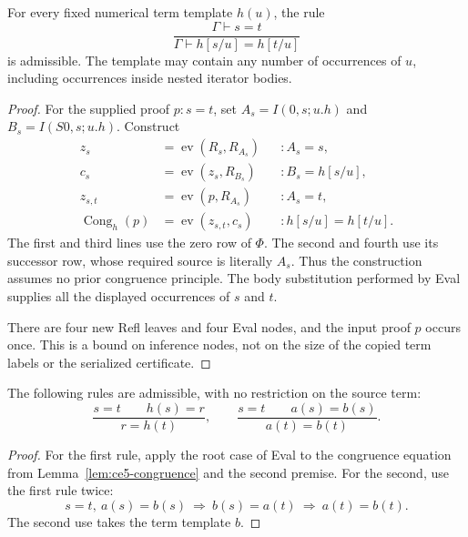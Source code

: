 \begin{lemma}
\label{lem:ce5-congruence}
For every fixed numerical term template $h(u)$, the rule
\[
 \frac{\Gamma\vdash s=t}
      {\Gamma\vdash h[s/u]=h[t/u]}
\]
is admissible. The template may contain any number of occurrences of
$u$, including occurrences inside nested iterator bodies.
\end{lemma}
\begin{proof}
For the supplied proof $p:s=t$, set
$A_s=I(0,s;u.h)$ and $B_s=I(S0,s;u.h)$. Construct
\[
\begin{aligned}
 z_s&=\operatorname{ev}(R_s,R_{A_s})
       &&: A_s=s,\\
 c_s&=\operatorname{ev}(z_s,R_{B_s})
       &&: B_s=h[s/u],\\
 z_{s,t}&=\operatorname{ev}(p,R_{A_s})
       &&: A_s=t,\\
 \operatorname{Cong}_h(p)&=\operatorname{ev}(z_{s,t},c_s)
       &&: h[s/u]=h[t/u].
\end{aligned}
\]
The first and third lines use the zero row of $\Phi$. The second and
fourth use its successor row, whose required source is literally
$A_s$. Thus the construction assumes no prior congruence principle.
The body substitution performed by Eval supplies all the displayed
occurrences of $s$ and $t$.

There are four new Refl leaves and four Eval nodes, and the input proof
$p$ occurs once. This is a bound on inference nodes, not on the size of
the copied term labels or the serialized certificate.
\end{proof}

\begin{corollary}
The following rules are admissible, with no restriction on the source
term:
\[
 \frac{s=t\qquad h(s)=r}{r=h(t)},\qquad
 \frac{s=t\qquad a(s)=b(s)}{a(t)=b(t)}.
\]
\end{corollary}
\begin{proof}
For the first rule, apply the root case of Eval to the congruence
equation from Lemma~\ref{lem:ce5-congruence} and the second premise.
For the second, use the first rule twice:
\[
 s=t,\ a(s)=b(s)\ \Longrightarrow\ b(s)=a(t)
 \ \Longrightarrow\ a(t)=b(t).
\]
The second use takes the term template $b$.
\end{proof}

